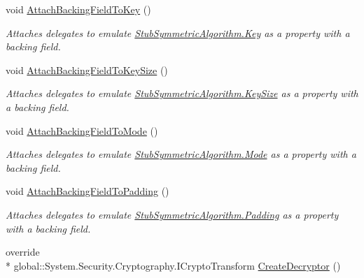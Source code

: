 \begin{DoxyCompactItemize}
void \hyperlink{class_system_1_1_security_1_1_cryptography_1_1_fakes_1_1_stub_symmetric_algorithm_a35067da21dee4a5fa1839077dd1e645f}{Attach\-Backing\-Field\-To\-Key} ()
\begin{DoxyCompactList}\small\item\em Attaches delegates to emulate \hyperlink{class_system_1_1_security_1_1_cryptography_1_1_fakes_1_1_stub_symmetric_algorithm_ab15a20157deb0d062b6939eaf174aa36}{Stub\-Symmetric\-Algorithm.\-Key} as a property with a backing field.\end{DoxyCompactList}\item 
void \hyperlink{class_system_1_1_security_1_1_cryptography_1_1_fakes_1_1_stub_symmetric_algorithm_ae3159ed48b9aa2e0b7a8209b6433a9c8}{Attach\-Backing\-Field\-To\-Key\-Size} ()
\begin{DoxyCompactList}\small\item\em Attaches delegates to emulate \hyperlink{class_system_1_1_security_1_1_cryptography_1_1_fakes_1_1_stub_symmetric_algorithm_a2a1a7619c3c2b318c2ffa5631ab2ba7a}{Stub\-Symmetric\-Algorithm.\-Key\-Size} as a property with a backing field.\end{DoxyCompactList}\item 
void \hyperlink{class_system_1_1_security_1_1_cryptography_1_1_fakes_1_1_stub_symmetric_algorithm_a54454a913e5a2954eafaeadbfc86fd35}{Attach\-Backing\-Field\-To\-Mode} ()
\begin{DoxyCompactList}\small\item\em Attaches delegates to emulate \hyperlink{class_system_1_1_security_1_1_cryptography_1_1_fakes_1_1_stub_symmetric_algorithm_af72cb6f6cd2f81df196e1025ac98db92}{Stub\-Symmetric\-Algorithm.\-Mode} as a property with a backing field.\end{DoxyCompactList}\item 
void \hyperlink{class_system_1_1_security_1_1_cryptography_1_1_fakes_1_1_stub_symmetric_algorithm_a05dc257f4f5182c643fc3187154ef731}{Attach\-Backing\-Field\-To\-Padding} ()
\begin{DoxyCompactList}\small\item\em Attaches delegates to emulate \hyperlink{class_system_1_1_security_1_1_cryptography_1_1_fakes_1_1_stub_symmetric_algorithm_acd823f53616acf9908a7d34956769082}{Stub\-Symmetric\-Algorithm.\-Padding} as a property with a backing field.\end{DoxyCompactList}\item 
override \\*
global\-::\-System.\-Security.\-Cryptography.\-I\-Crypto\-Transform \hyperlink{class_system_1_1_security_1_1_cryptography_1_1_fakes_1_1_stub_symmetric_algorithm_a75952a4c8400bbded53eaed29fb06a34}{Create\-Decryptor} ()

\end{DoxyCompactItemize}
